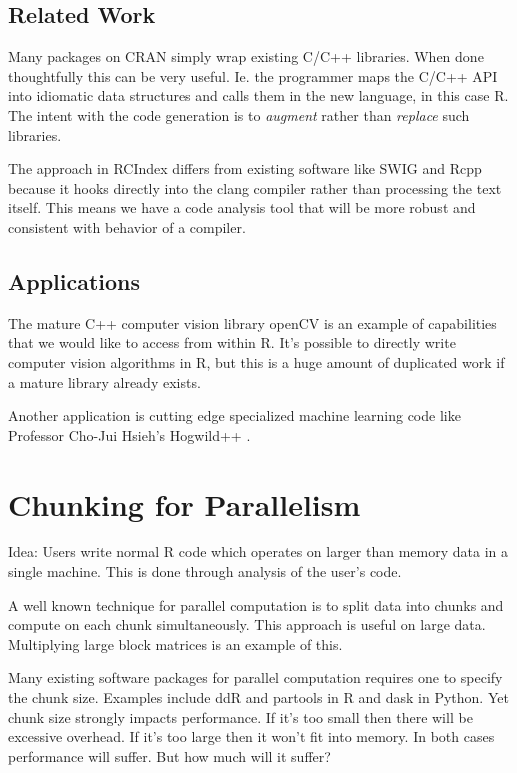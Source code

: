 \documentclass[12pt]{article}
\begin{document}
\subsection{Related Work}

Many packages on CRAN simply wrap existing C/C++ libraries. When done
thoughtfully this can be very useful. Ie. the programmer maps the C/C++ API
into idiomatic data structures and calls them in the new language, in this case
R. 
The intent with the code generation is to \emph{augment} rather than
\emph{replace} such libraries. 

The approach in RCIndex differs from existing software like SWIG
\cite{swig} and Rcpp \cite{R-Rcpp} because it hooks directly into the clang
compiler rather than processing the text itself. This means we have a code
analysis tool that will be more robust and consistent with behavior of a compiler. 

\subsection{Applications}

The mature C++ computer vision library openCV
\cite{opencv_library} is an example of capabilities that we would like to
access from within R. It's possible to directly write computer vision
algorithms in R, but this is a huge amount of duplicated work if a mature
library already exists.

Another application is cutting edge specialized machine learning code like
Professor Cho-Jui Hsieh's Hogwild++ \cite{zhang2016hogwild}.

\section{Chunking for Parallelism}

Idea: Users write normal R code which operates on larger than
memory data in a single machine. This is done through analysis of the
user's code.

A well known technique for parallel computation is to split data into
chunks and compute on each chunk simultaneously. This approach 
is useful on large data. Multiplying large block matrices is an example of this.

Many existing software packages for parallel computation requires one to specify the
chunk size. Examples include ddR \cite{R-ddR} and partools
\cite{R-partools} in R and dask in Python.
Yet chunk size strongly impacts
performance. If it's too small then there will be excessive overhead. If
it's too large then it won't fit into memory. In both cases performance
will suffer. But how much will it suffer?
\end{document}
